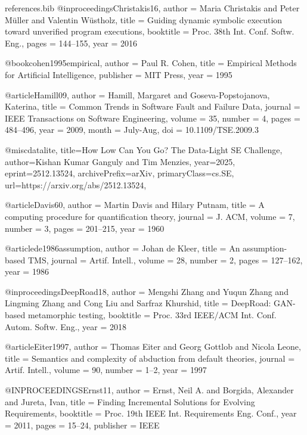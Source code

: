 \documentclass[pdflatex,sn-basic]{sn-jnl}
\begin{document}
\begin{filecontents}{references.bib}
@inproceedings{Christakis16,
  author    = {Maria Christakis and Peter M{\"u}ller and Valentin W{\"u}stholz},
  title     = {Guiding dynamic symbolic execution toward unverified program executions},
  booktitle = {Proc. 38th Int. Conf. Softw. Eng.},
  pages     = {144--155},
  year      = {2016}
}



@book{cohen1995empirical,
  author    = {Paul R. Cohen},
  title     = {Empirical Methods for Artificial Intelligence},
  publisher = {MIT Press},
  year      = {1995}
}

@article{Hamill09,
  author = {Hamill, Margaret and Goseva-Popstojanova, Katerina},
  title = {Common Trends in Software Fault and Failure Data},
  journal = {IEEE Transactions on Software Engineering},
  volume = {35},
  number = {4},
  pages = {484--496},
  year = {2009},
  month = {July-Aug},
  doi = {10.1109/TSE.2009.3}
}

 

@misc{datalite,
      title={How Low Can You Go? The Data-Light SE Challenge}, 
      author={Kishan Kumar Ganguly and Tim Menzies},
      year={2025},
      eprint={2512.13524},
      archivePrefix={arXiv},
      primaryClass={cs.SE},
      url={https://arxiv.org/abs/2512.13524}, 
}

@article{Davis60,
  author  = {Martin Davis and Hilary Putnam},
  title   = {A computing procedure for quantification theory},
  journal = {J. ACM},
  volume  = {7},
  number  = {3},
  pages   = {201--215},
  year    = {1960}
}



@article{de1986assumption,
  author  = {Johan de Kleer},
  title   = {An assumption-based TMS},
  journal = {Artif. Intell.},
  volume  = {28},
  number  = {2},
  pages   = {127--162},
  year    = {1986}
}



@inproceedings{DeepRoad18,
  author    = {Mengshi Zhang and Yuqun Zhang and Lingming Zhang and Cong Liu and Sarfraz Khurshid},
  title     = {DeepRoad: GAN-based metamorphic testing},
  booktitle = {Proc. 33rd IEEE/ACM Int. Conf. Autom. Softw. Eng.},
  year      = {2018}
}



@article{Eiter1997,
  author  = {Thomas Eiter and Georg Gottlob and Nicola Leone},
  title   = {Semantics and complexity of abduction from default theories},
  journal = {Artif. Intell.},
  volume  = {90},
  number  = {1--2},
  year    = {1997}
}


@INPROCEEDINGS{Ernst11,
  author    = {Ernst, Neil A. and Borgida, Alexander and Jureta, Ivan},
  title     = {Finding Incremental Solutions for Evolving Requirements},
  booktitle = {Proc. 19th IEEE Int. Requirements Eng. Conf.},
  year      = {2011},
  pages     = {15--24},
  publisher = {IEEE}
}


\end{filecontents}
\end{document}
